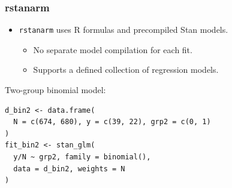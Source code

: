 \documentclass[10pt]{beamer}
\begin{document}
\begin{frame}[fragile]

\frametitle{rstanarm}

  \begin{itemize}
  \item \texttt{rstanarm} uses R formulas and precompiled Stan models.
    \begin{itemize}
    \item No separate model compilation for each fit.
    \item Supports a defined collection of regression models.
    \end{itemize}
  \end{itemize}

Two-group binomial model:
  {\scriptsize
\begin{lstlisting}
d_bin2 <- data.frame(
  N = c(674, 680), y = c(39, 22), grp2 = c(0, 1)
)
fit_bin2 <- stan_glm(
  y/N ~ grp2, family = binomial(),
  data = d_bin2, weights = N
)
\end{lstlisting}
  }


\end{frame}
\end{document}
